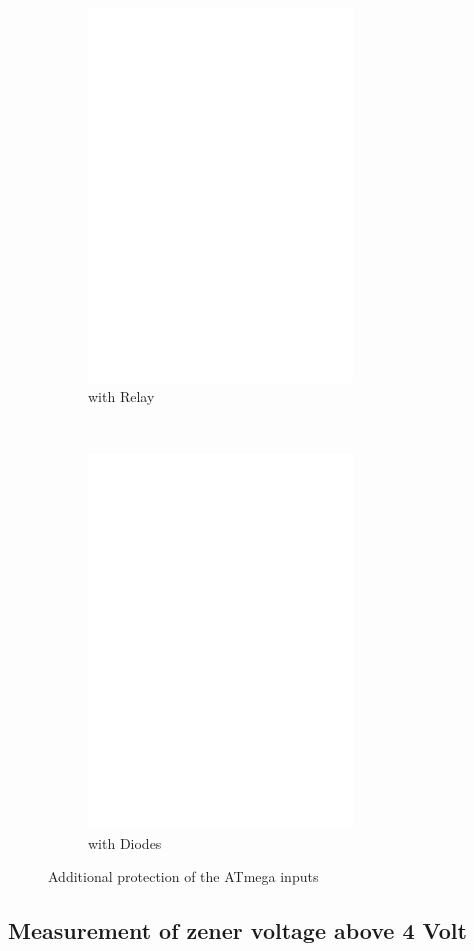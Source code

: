 \begin{figure}[H]
  \begin{subfigure}[b]{9cm}
    \centering
    \includegraphics[width=7cm]{../FIG/relay_addon.eps}
    \caption{with Relay}
  \end{subfigure}
  ~
  \begin{subfigure}[b]{9cm}
    \centering
    \includegraphics[width=7cm]{../FIG/diode_addon.eps}
    \caption{with Diodes}
  \end{subfigure}
  \caption{Additional protection of the ATmega inputs}
  \label{fig:relay_addon}
\end{figure}

\subsection{Measurement of zener voltage above 4 Volt}

